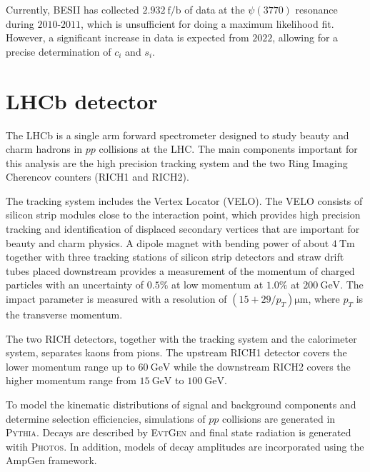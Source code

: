 \documentclass[12pt, a4paper, notitlepage, onecolumn]{article}
\def\pythia{\mbox{\textsc{Pythia}}\xspace}
\def\evtgen{\mbox{\textsc{EvtGen}}\xspace}
\def\photos{\mbox{\textsc{Photos}}\xspace}
\numberwithin{equation}{section}
\begin{document}
Currently, BESII has collected $\SI{2.932}{\femto\per\barn}$ of data at the $\psi(3770)$ resonance during $2010$-$2011$, which is unsufficient for doing a maximum likelihood fit. However, a significant increase in data is expected from $2022$, allowing for a precise determination of $c_i$ and $s_i$.
\section{LHCb detector}
\noindent The LHCb is a single arm forward spectrometer designed to study beauty and charm hadrons in $pp$ collisions at the LHC. The main components important for this analysis are the high precision tracking system and the two Ring Imaging Cherencov counters (RICH1 and RICH2).

The tracking system includes the Vertex Locator (VELO). The VELO consists of silicon strip modules close to the interaction point, which provides high precision tracking and identification of displaced secondary vertices that are important for beauty and charm physics. A dipole magnet with bending power of about $\SI{4}{\tesla\meter}$ together with three tracking stations of silicon strip detectors and straw drift tubes placed downstream provides a measurement of the momentum of charged particles with an uncertainty of $0.5\%$ at low momentum at $1.0\%$ at $\SI{200}{\giga\eV}$. The impact parameter is measured with a resolution of $(15 + 29/p_T)\si{\micro\meter}$, where $p_T$ is the transverse momentum.

The two RICH detectors, together with the tracking system and the calorimeter system, separates kaons from pions. The upstream RICH1 detector covers the lower momentum range up to $\SI{60}{\giga\eV}$ while the downstream RICH2 covers the higher momentum range from $\SI{15}{\giga\eV}$ to $\SI{100}{\giga\eV}$.

To model the kinematic distributions of signal and background components and determine selection efficiencies, simulations of $pp$ collisions are generated in \pythia. Decays are described by \evtgen and final state radiation is generated witih \photos. In addition, models of decay amplitudes are incorporated using the AmpGen framework.

\end{document}
